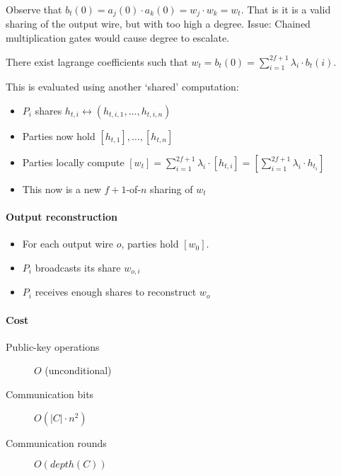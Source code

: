 Observe that $b_t(0) = a_j(0) \cdot a_k(0) = w_j \cdot w_k = w_t$. That is it
is a valid sharing of the output wire, but with too high a degree. Issue:
Chained multiplication gates would cause degree to escalate.

There exist lagrange coefficients such that $w_t = b_t(0) = \sum_{i=1}^{2f + 1}
\lambda_i \cdot b_t(i)$.

This is evaluated using another `shared' computation:
\begin{itemize}
  \item $P_i$ shares $h_{t, i} \leftrightarrow (h_{t, i, 1}, \ldots, h_{t, i, n})$
  \item Parties now hold $[h_{t, 1}], \ldots, [h_{t, n}]$
  \item Parties locally compute $[w_t] = \sum_{i=1}^{2f+1} \lambda_i \cdot [h_{t, i}] = [\sum_{i=1}^{2f + 1} \lambda_i \cdot h_{t_i}]$
  \item This now is a new $f+1$-of-$n$ sharing of $w_t$
\end{itemize}

\paragraph{Output reconstruction}

\begin{itemize}
  \item For each output wire $o$, parties hold $[w_0]$.
  \item $P_i$ broadcasts its share $w_{o, i}$
  \item $P_i$ receives enough shares to reconstruct $w_o$
\end{itemize}

\paragraph{Cost}

\begin{description}
  \item[Public-key operations] $O$ (unconditional)
  \item[Communication bits] $O(|C| \cdot n^2)$
  \item[Communication rounds] $O(depth(C))$
\end{description}
